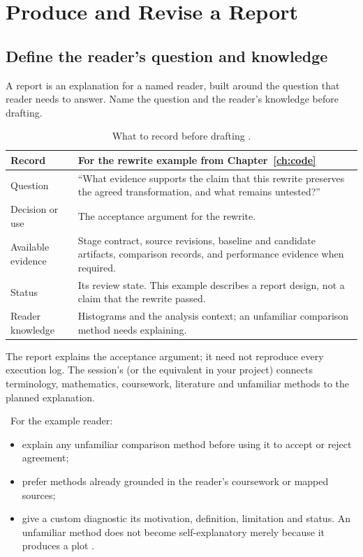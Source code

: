 \chapter{Produce and Revise a Report}\label{ch:reports}
\section{Define the reader's question and knowledge}

\begin{headline}
  A report is an explanation for a named reader, built around the question that reader
  needs to answer. Name the question and the reader's knowledge before drafting.
\end{headline}

\begin{table}[H]
  \small
  \begin{tabularx}{\textwidth}{L{0.27\textwidth}Y}
    \toprule
    Record & For the rewrite example from Chapter~\ref{ch:code} \\
    \midrule
    Question & ``What evidence supports the claim that this rewrite preserves the agreed
    transformation, and what remains untested?'' \\
    Decision or use & The acceptance argument for the rewrite. \\
    Available evidence & Stage contract, source revisions, baseline and candidate artifacts,
    comparison records, and performance evidence when required. \\
    Status & Its review state. This example describes a report design, not a claim that the
    rewrite passed. \\
    Reader knowledge & Histograms and the analysis context; an unfamiliar comparison method needs explaining. \\
    \bottomrule
  \end{tabularx}
  \caption{What to record before drafting \cite[Audience and authority; Design the
      argument]{skill:report-production}.}
  \label{tab:reports-question}
\end{table}

The report explains the acceptance argument; it need not reproduce every execution log.
The session's  (or the equivalent in your project)
connects terminology, mathematics, coursework, literature and unfamiliar methods to the
planned explanation.

\contract\ For the example reader:
\begin{itemize}
  \item explain any unfamiliar comparison method before using it to accept or reject agreement;
  \item prefer methods already grounded in the reader's coursework or mapped sources;
  \item give a custom diagnostic its motivation, definition, limitation and status. An unfamiliar
        method does not become self-explanatory merely because it produces a plot \cite[Design
          the argument]{skill:report-production}.
\end{itemize}

